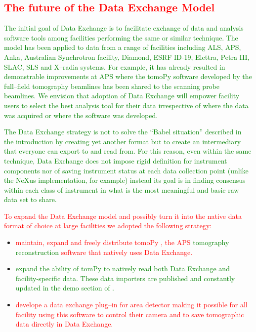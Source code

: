 \documentclass[pdf]{iucr}              %
\begin{document}
\textcolor{red}{\section{The future of the Data Exchange Model}}

\textcolor{green}{The initial goal of Data Exchange is to facilitate exchange of data and analysis software tools among facilities performing the same or similar technique. The model has been applied to data from a range of facilities including ALS, APS, Anka, Australian Synchrotron facility, Diamond, ESRF ID-19, Elettra, Petra III, SLAC, SLS and X--radia systems. For example, it has already resulted in demonstrable improvements at APS where the tomoPy software developed by the full--field tomography beamlines has been shared to the scanning probe beamlines. We envision that adoption of Data Exchange will empower facility users to select the best analysis tool for their data irrespective of where the data was acquired or where the software was developed.}

\textcolor{green}{The Data Exchange strategy is not to solve the ``Babel situation'' described in the introduction by creating yet another format but to create an intermediary that everyone can export to and read from. For this reason, even within the same technique, Data Exchange does not impose rigid definition for instrument components nor of saving instrument status at each data collection point (unlike the NeXus implementation, for example) instead its goal is in finding consensus within each class of instrument in what is the most meaningful and basic raw data set to share.}

\textcolor{red}{To expand the Data Exchange model and possibly turn it into the native data format of choice at large facilities we adopted the following strategy:}

\begin{itemize}
    \item \textcolor{red}{maintain, expand and freely distribute tomoPy \cite{python_cpp}, the APS \textcolor{green}{tomography reconstruction} software that natively uses Data Exchange.} 
\item \textcolor{green}{expand the ability of tomPy to natively read both Data Exchange and facility-specific data. These data importers are published and constantly updated in the demo section of \cite{data_exchange}.}
\item \textcolor{red}{develope a data exchange plug--in for area detector \cite{area_detector} making it possible for all facility using this software to control their camera and to save tomographic data directly in Data Exchange.}
\end{itemize}
\end{document}
